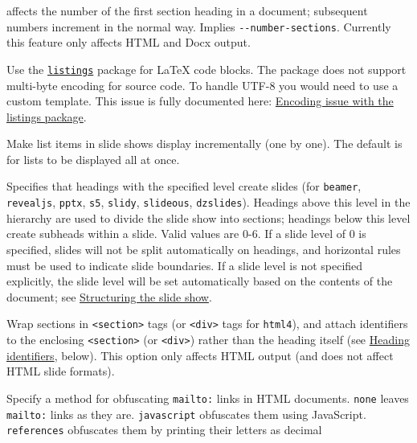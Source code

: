 \documentclass[
  b5paper
]{book}
\begin{document}
\begin{description}
affects the number of the first section heading in a document;
subsequent numbers increment in the normal way. Implies
\texttt{-\/-number-sections}. Currently this feature only affects HTML
and Docx output.
\item[\texttt{-\/-listings{[}=true\textbar{}false{]}}]
Use the \href{https://ctan.org/pkg/listings}{\texttt{listings}} package
for LaTeX code blocks. The package does not support multi-byte encoding
for source code. To handle UTF-8 you would need to use a custom
template. This issue is fully documented here:
\href{https://en.wikibooks.org/wiki/LaTeX/Source_Code_Listings\#Encoding_issue}{Encoding
issue with the listings package}.
\item[\texttt{-i}, \texttt{-\/-incremental{[}=true\textbar{}false{]}}]
Make list items in slide shows display incrementally (one by one). The
default is for lists to be displayed all at once.
\item[\texttt{-\/-slide-level=}\emph{NUMBER}]
Specifies that headings with the specified level create slides (for
\texttt{beamer}, \texttt{revealjs}, \texttt{pptx}, \texttt{s5},
\texttt{slidy}, \texttt{slideous}, \texttt{dzslides}). Headings above
this level in the hierarchy are used to divide the slide show into
sections; headings below this level create subheads within a slide.
Valid values are 0-6. If a slide level of 0 is specified, slides will
not be split automatically on headings, and horizontal rules must be
used to indicate slide boundaries. If a slide level is not specified
explicitly, the slide level will be set automatically based on the
contents of the document; see
\hyperref[structuring-the-slide-show]{Structuring the slide show}.
\item[\texttt{-\/-section-divs{[}=true\textbar{}false{]}}]
Wrap sections in \texttt{\textless{}section\textgreater{}} tags (or
\texttt{\textless{}div\textgreater{}} tags for \texttt{html4}), and
attach identifiers to the enclosing
\texttt{\textless{}section\textgreater{}} (or
\texttt{\textless{}div\textgreater{}}) rather than the heading itself
(see \hyperref[heading-identifiers]{Heading identifiers}, below). This
option only affects HTML output (and does not affect HTML slide
formats).
\item[\texttt{-\/-email-obfuscation=none}\textbar{}\texttt{javascript}\textbar{}\texttt{references}]
Specify a method for obfuscating \texttt{mailto:} links in HTML
documents. \texttt{none} leaves \texttt{mailto:} links as they are.
\texttt{javascript} obfuscates them using JavaScript.
\texttt{references} obfuscates them by printing their letters as decimal

\end{description}
\end{document}

